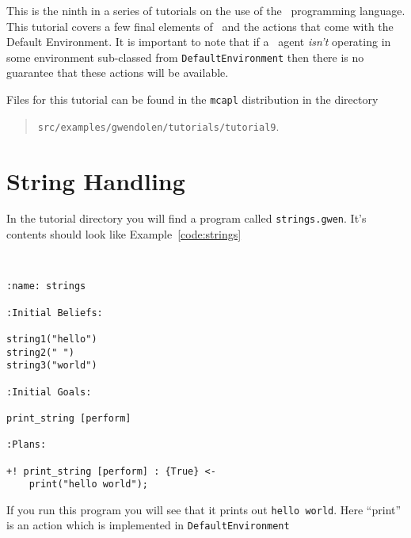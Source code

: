 \label{tutorial:gwendolen:default_actions}
This is the ninth in a series of tutorials on the use of the \gwendolen\ programming language.  This tutorial covers a few final elements of \gwendolen\ and the actions that come with the Default Environment.  It is important to note that if a \gwendolen\ agent \emph{isn't} operating in some environment sub-classed from \texttt{DefaultEnvironment} then there is no guarantee that these actions will be available.

Files for this tutorial can be found in the \texttt{mcapl} distribution in the directory 
\begin{quote}
\texttt{src/examples/gwendolen/tutorials/tutorial9}.
\end{quote}

\section{String Handling}

In the tutorial directory you will find a program called \texttt{strings.gwen}.  It's contents should look like Example~\ref{code:strings}
\begin{ourexample}
\label{code:strings} \quad \\
\begin{lstlisting}[basicstyle=\sffamily,style=easslisting,language=Gwendolen]
:name: strings

:Initial Beliefs:

string1("hello")
string2(" ")
string3("world")

:Initial Goals:

print_string [perform]

:Plans:

+! print_string [perform] : {True} <-
	print("hello world");
\end{lstlisting}
\end{ourexample}
If you run this program you will see that it prints out \texttt{hello world}.  Here ``print'' is an action which is implemented in \texttt{DefaultEnvironment}

